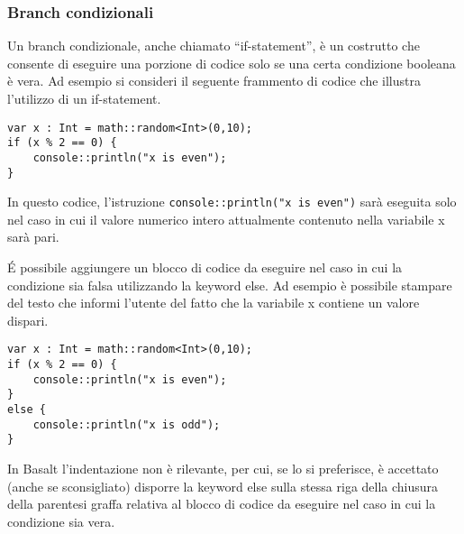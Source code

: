 \subsubsection{Branch condizionali}
Un branch condizionale, anche chiamato “if-statement”, è un costrutto che consente di eseguire una porzione di codice solo se una certa condizione booleana è vera. Ad esempio si consideri 
il seguente frammento di codice che illustra l’utilizzo di un if-statement.


\vspace{0.5cm}

\begin{lstlisting}[frame=single]
var x : Int = math::random<Int>(0,10);
if (x % 2 == 0) {
    console::println("x is even");
}
\end{lstlisting}


\vspace{0.5cm}

In questo codice, l’istruzione \texttt{console::println("x is even")} sarà eseguita solo nel caso in cui il valore numerico intero attualmente contenuto nella variabile x sarà pari. 

É possibile aggiungere un blocco di codice da eseguire nel caso in cui la condizione sia falsa utilizzando la keyword else. Ad esempio è possibile stampare del testo che 
informi l’utente del fatto che la variabile x contiene un valore dispari.

\vspace{0.5cm}

\begin{lstlisting}[frame=single]
var x : Int = math::random<Int>(0,10);
if (x % 2 == 0) {
    console::println("x is even");
}
else {
    console::println("x is odd");
}    
\end{lstlisting}


\vspace{0.5cm}

In Basalt l’indentazione non è rilevante, per cui, se lo si preferisce, è accettato (anche se sconsigliato) disporre la keyword else sulla stessa riga della 
chiusura della parentesi graffa relativa al blocco di codice da eseguire nel caso in cui la condizione sia vera.
